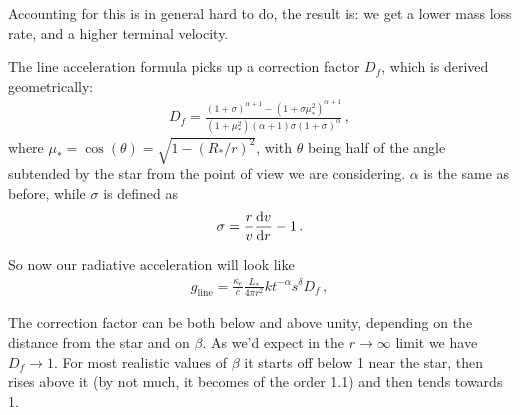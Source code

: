 \documentclass[main.tex]{subfiles}
\begin{document}
Accounting for this is in general hard to do, the result is: we get a lower mass loss rate, and a higher terminal velocity. 

The line acceleration formula picks up a correction factor \(D_f\), which is derived geometrically: 
%
\begin{align}
D_f = \frac{(1+\sigma )^{\alpha +1 } - (1+\sigma \mu_{*}^2)^{\alpha +1}}{ (1 + \mu_{*}^2) (\alpha +1) \sigma (1+\sigma )^{\alpha }}
\,,
\end{align}
%
where \(\mu_{*} = \cos(\theta ) = \sqrt{1 - (R_{*} /r)^2}\),
with \(\theta \) being half of the angle subtended by the star from the point of view we are considering. \(\alpha \) is the same as before, while \(\sigma \) is defined as 
%
\begin{align}
\sigma = \frac{r}{v} \dv{v}{r}  -1
\,.
\end{align}
%

So now our radiative acceleration will look like 
%
\begin{align}
g _{\text{line}} = \frac{\kappa_{e}}{c}\frac{L_{*}}{4 \pi r^2} k t^{-\alpha } s^{ \delta } D_f
\,,
\end{align}
%


The correction factor can be both below and above unity, depending on the distance from the star and on \(\beta \). 
As we'd expect in the \(r \rightarrow \infty \) limit we have \(D_f \rightarrow 1\). 
For most realistic values of \(\beta \) it starts off below 1 near the star, then rises above it (by not much, it becomes of the order \num{1.1}) and then tends towards 1.
\end{document}
